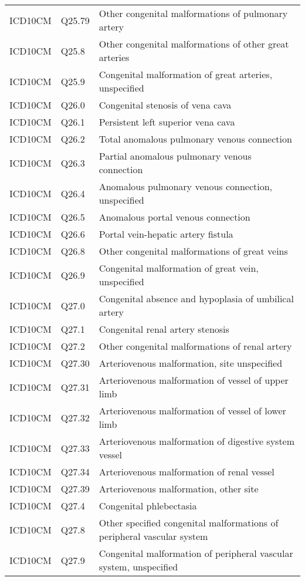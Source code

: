 \begin{longtable}{p{}p{}p{}}
  ICD10CM & Q25.79 & Other congenital malformations of pulmonary artery \\ 
  ICD10CM & Q25.8 & Other congenital malformations of other great arteries \\ 
  ICD10CM & Q25.9 & Congenital malformation of great arteries, unspecified \\ 
  ICD10CM & Q26.0 & Congenital stenosis of vena cava \\ 
  ICD10CM & Q26.1 & Persistent left superior vena cava \\ 
  ICD10CM & Q26.2 & Total anomalous pulmonary venous connection \\ 
  ICD10CM & Q26.3 & Partial anomalous pulmonary venous connection \\ 
  ICD10CM & Q26.4 & Anomalous pulmonary venous connection, unspecified \\ 
  ICD10CM & Q26.5 & Anomalous portal venous connection \\ 
  ICD10CM & Q26.6 & Portal vein-hepatic artery fistula \\ 
  ICD10CM & Q26.8 & Other congenital malformations of great veins \\ 
  ICD10CM & Q26.9 & Congenital malformation of great vein, unspecified \\ 
  ICD10CM & Q27.0 & Congenital absence and hypoplasia of umbilical artery \\ 
  ICD10CM & Q27.1 & Congenital renal artery stenosis \\ 
  ICD10CM & Q27.2 & Other congenital malformations of renal artery \\ 
  ICD10CM & Q27.30 & Arteriovenous malformation, site unspecified \\ 
  ICD10CM & Q27.31 & Arteriovenous malformation of vessel of upper limb \\ 
  ICD10CM & Q27.32 & Arteriovenous malformation of vessel of lower limb \\ 
  ICD10CM & Q27.33 & Arteriovenous malformation of digestive system vessel \\ 
  ICD10CM & Q27.34 & Arteriovenous malformation of renal vessel \\ 
  ICD10CM & Q27.39 & Arteriovenous malformation, other site \\ 
  ICD10CM & Q27.4 & Congenital phlebectasia \\ 
  ICD10CM & Q27.8 & Other specified congenital malformations of peripheral vascular system \\ 
  ICD10CM & Q27.9 & Congenital malformation of peripheral vascular system, unspecified \\ 

\end{longtable}

